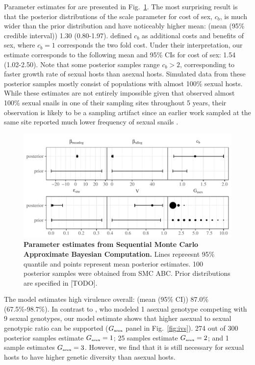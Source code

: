 \documentclass{article}\usepackage[]{graphicx}\usepackage[]{color}
\newcommand{\fref}[1]{Fig.~\ref{fig:#1}}
\begin{document}
Parameter estimates for \cite{vergara2014infection} are presented in \fref{smcparam}.
The most surprising result is that the posterior distributions of the scale parameter for cost of sex, $c_b$, is much wider than the prior distribution and have noticeably higher mean: (mean (95\% credible interval)) 1.30 (0.80-1.97).
\cite{ashby2015diversity} defined $c_b$ as additional costs and benefits of sex, where $c_b=1$ corresponds the two fold cost.
Under their interpretation, our estimate corresponds to the following mean and 95\% CIs for cost of sex: 1.54 (1.02-2.50).
Note that some posterior samples range $c_b > 2$, corresponding to faster growth rate of sexual hosts than asexual hosts.
Simulated data from these posterior samples mostly consist of populations with almost 100\% sexual hosts.
While these estimates are not entirely impossible given that \cite{vergara2014infection} observed almost 100\% sexual snails in one of their sampling sites throughout 5 years, their observation is likely to be a sampling artifact since an earlier work sampled at the same site reported much lower frequency of sexual snails \citep{vergara2013geographic}. %

\begin{figure}[!ht]
\includegraphics[width=\textwidth]{../fig/verg_post.pdf}
\caption{{\bf Parameter estimates from Sequential Monte Carlo Approximate Bayesian Computation.}
Lines repreesnt 95\% quantile and points represent mean posterior estimates. 100 posterior samples were obtained from SMC ABC. Prior distributions are specified in [TODO].
}
\label{fig:smcparam}
\end{figure}

The model estimates high virulence overall: (mean (95\% CI)) 87.0\% (67.5\%-98.7\%).
In contrast to \cite{lively2010epidemiological}, who modeled 1 asexual genotype competing with 9 sexual genotypes, our model estimate shows that higher asexual to sexual genotypic ratio can be supported ($G_{\textrm{\tiny asex}}$ panel in \fref{ivs}).
274 out of 300 posterior samples estimate $G_{\textrm{\tiny asex}} = 1$; 25 samples estimate $G_{\textrm{\tiny asex}} = 2$; and 1 sample estimates $G_{\textrm{\tiny asex}} = 3$.
However, we find that it is still necessary for sexual hosts to have higher genetic diversity than asexual hosts.
\end{document}
